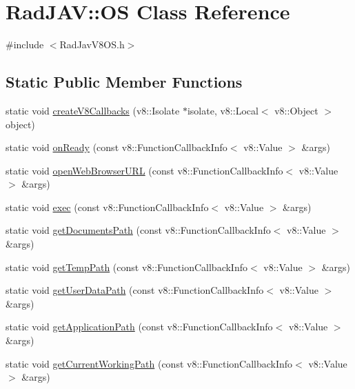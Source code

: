 \hypertarget{class_rad_j_a_v_1_1_o_s}{}\section{Rad\+J\+AV\+:\+:OS Class Reference}
\label{class_rad_j_a_v_1_1_o_s}


{\ttfamily \#include $<$Rad\+Jav\+V8\+O\+S.\+h$>$}

\subsection*{Static Public Member Functions}
\begin{DoxyCompactItemize}
\item 
static void \mbox{\hyperlink{class_rad_j_a_v_1_1_o_s_aae5cf6fa6bc766aa0f807b1e1234c6e3}{create\+V8\+Callbacks}} (v8\+::\+Isolate $\ast$isolate, v8\+::\+Local$<$ v8\+::\+Object $>$ object)
\item 
static void \mbox{\hyperlink{class_rad_j_a_v_1_1_o_s_a960d61a9a7007bd45a9448786fffb640}{on\+Ready}} (const v8\+::\+Function\+Callback\+Info$<$ v8\+::\+Value $>$ \&args)
\item 
static void \mbox{\hyperlink{class_rad_j_a_v_1_1_o_s_a72a5afc1380fa26d24c32a2b81abb5b5}{open\+Web\+Browser\+U\+RL}} (const v8\+::\+Function\+Callback\+Info$<$ v8\+::\+Value $>$ \&args)
\item 
static void \mbox{\hyperlink{class_rad_j_a_v_1_1_o_s_a0a0c9a7193e16bcad860e84c3802a709}{exec}} (const v8\+::\+Function\+Callback\+Info$<$ v8\+::\+Value $>$ \&args)
\item 
static void \mbox{\hyperlink{class_rad_j_a_v_1_1_o_s_acc151d58456468bb6e2b17bea321d326}{get\+Documents\+Path}} (const v8\+::\+Function\+Callback\+Info$<$ v8\+::\+Value $>$ \&args)
\item 
static void \mbox{\hyperlink{class_rad_j_a_v_1_1_o_s_a4cf0d596d582f1c75c208dd576979f85}{get\+Temp\+Path}} (const v8\+::\+Function\+Callback\+Info$<$ v8\+::\+Value $>$ \&args)
\item 
static void \mbox{\hyperlink{class_rad_j_a_v_1_1_o_s_a6bb1ba10acf9fdfbdd88e192ecb651f7}{get\+User\+Data\+Path}} (const v8\+::\+Function\+Callback\+Info$<$ v8\+::\+Value $>$ \&args)
\item 
static void \mbox{\hyperlink{class_rad_j_a_v_1_1_o_s_a8430cf53e13cdb19f1257ea1c98ff20d}{get\+Application\+Path}} (const v8\+::\+Function\+Callback\+Info$<$ v8\+::\+Value $>$ \&args)
\item 
static void \mbox{\hyperlink{class_rad_j_a_v_1_1_o_s_a77a5688a5d892b20aa2c5ae508c6e07d}{get\+Current\+Working\+Path}} (const v8\+::\+Function\+Callback\+Info$<$ v8\+::\+Value $>$ \&args)

\end{DoxyCompactItemize}
